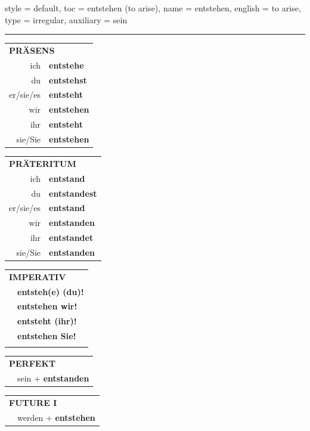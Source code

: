 \begin{verbentry}{
  style = {default},
  toc = {entstehen (to arise)},
  name = {entstehen},
  english = {to arise},
  type = {irregular},
  auxiliary = {sein}
}
 
    
     \vspace{5pt}

    \hrule
    
    \vspace{5pt}

  \begin{tabular}{rl}
     \multicolumn{2}{l}{\textbf{PRÄSENS} }\\
    ich & \textbf{entstehe}\\
    du & \textbf{entstehst}\\
    er/sie/es & \textbf{entsteht}\\
    wir & \textbf{entstehen}\\
    ihr & \textbf{entsteht}\\
    sie/Sie & \textbf{entstehen}\\
  \end{tabular}
  \hfill
     \begin{tabular}{rl}
    \multicolumn{2}{l}{\textbf{PRÄTERITUM} }\\
    ich & \textbf{entstand}\\
    du & \textbf{entstandest}\\
    er/sie/es & \textbf{entstand}\\
    wir & \textbf{entstanden}\\
    ihr & \textbf{entstandet}\\
    sie/Sie & \textbf{entstanden}\\
  \end{tabular}
  \hfill
  \begin{tabular}{rl}
     \multicolumn{2}{l}{\textbf{IMPERATIV} }\\
   & \textbf{entsteh(e) (du)!}\\
   & \textbf{entstehen wir!}\\
   & \textbf{entsteht (ihr)!}\\
   & \textbf{entstehen Sie!}\\
   & \vspace{10pt}
  \end{tabular}

    \vspace{10pt}

 \begin{tabular}{ll}
     \multicolumn{2}{l}{\textbf{PERFEKT}}\\
   & sein + \textbf{entstanden}\\
  \end{tabular}
\hfill
   \begin{tabular}{rl}
    \multicolumn{2}{l}{\textbf{FUTURE I} }\\
   & werden + \textbf{entstehen}\\
 

\end{tabular}
\end{verbentry}
